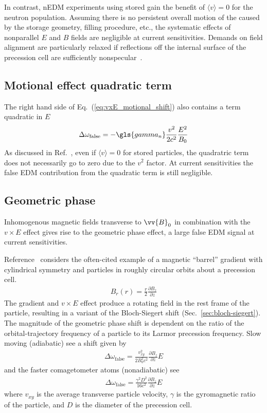 In contrast, nEDM experiments using stored \ucn gain the benefit of $\langle v \rangle =0$ for the neutron population. Assuming there is no persistent overall motion of the \ucn caused by the storage geometry, filling procedure, etc., the systematic effects of nonparallel $E$ and $B$ fields are negligible at current sensitivities. Demands on field alignment are particularly relaxed if \ucn reflections off the internal surface of the precession cell are sufficiently nonspecular~\cite{pendlebury_revised_2015}.

\subsection*{Motional effect quadratic term}

The right hand side of Eq.~(\ref{eq:vxE_motional_shift}) also contains a term quadratic in $E$
%
\begin{gather}
    \Delta\omega_\text{false} = -\gls{gamma_n} \frac{v^2}{2c^2}\frac{E^2}{B_0} 
\end{gather}
%
As discussed in Ref.~\cite{lamoreaux_experimental_2009}, even if $\langle v \rangle=0$ for stored particles, the quadratric term does not necessarily go to zero due to the $v^2$ factor. At current sensitivities the false EDM contribution from the quadratic term is still negligible.

\subsection*{Geometric phase}

Inhomogenous magnetic fields transverse to $\vv{B}_0$ in combination with the $v\times E$ effect gives rise to the geometric phase effect, a large false EDM signal at current sensitivities. 

Reference~\cite{pendlebury_geometric-phase-induced_2004} considers the often-cited example of a  magnetic ``barrel'' gradient with cylindrical symmetry and particles in roughly circular orbits about a precession cell.
%
\begin{gather}
    B_r(r)=\frac{r}{2}\frac{\partial B_z}{\partial z}
\end{gather}
%
The gradient and $v\times E$ effect produce a rotating field in the rest frame of the particle, resulting in a variant of the Bloch-Siegert shift (Sec.~\ref{sec:bloch-siegert}). The magnitude of the geometric phase shift is dependent on the ratio of the orbital-trajectory frequency of a particle to its Larmor precession frequency. Slow moving \ucn (adiabatic) see a shift given by~\cite{pendlebury_geometric-phase-induced_2004, afach_measurement_2015}
%
\begin{gather}
    \Delta\omega_\text{false} = \frac{v^2_{xy}}{2 B_0^2 c^2}\frac{\partial B_z}{\partial z}E
\end{gather}
%
and the faster \hg comagetometer atoms (nonadiabatic) see
%
\begin{gather}
    \Delta\omega_\text{false} = \frac{\gamma^2 D^2}{16  c^2}\frac{\partial B_z}{\partial z}E
\end{gather}
%
where $v_{xy}$ is the average transverse particle velocity, $\gamma$ is the gyromagnetic ratio of the particle, and $D$ is the diameter of the precession cell. 

